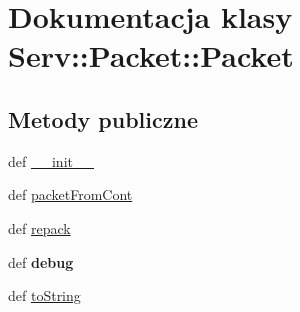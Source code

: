 \hypertarget{class_serv_1_1_packet_1_1_packet}{
\section{Dokumentacja klasy Serv::Packet::Packet}
\label{class_serv_1_1_packet_1_1_packet}
}
\subsection*{Metody publiczne}
\begin{DoxyCompactItemize}
\item 
def \hyperlink{class_serv_1_1_packet_1_1_packet_a1f71ef65b348c86a047c87abe9ca2775}{\_\-\_\-init\_\-\_\-}
\item 
def \hyperlink{class_serv_1_1_packet_1_1_packet_a393243697bc1e23d5adadc50698fccd1}{packetFromCont}
\item 
def \hyperlink{class_serv_1_1_packet_1_1_packet_a6dab330b602405f42b3fe090863e5c1e}{repack}
\item 
\hypertarget{class_serv_1_1_packet_1_1_packet_aca58d8a6836377fbe433aae6290e087a}{
def {\bfseries debug}}
\label{class_serv_1_1_packet_1_1_packet_aca58d8a6836377fbe433aae6290e087a}

\item 
def \hyperlink{class_serv_1_1_packet_1_1_packet_a2738b48c8c177150338082c936c823dc}{toString}
\end{DoxyCompactItemize}
